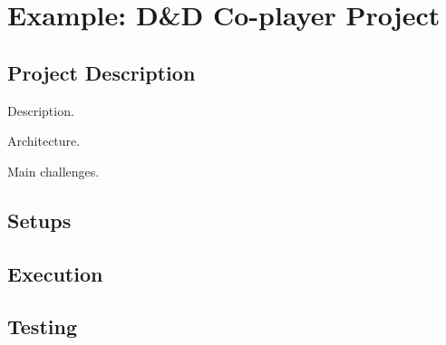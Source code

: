 \section{Example: D\&D Co-player Project}

\subsection{Project Description}

Description.

Architecture.

Main challenges.

\subsection{Setups}

\subsection{Execution}

\subsection{Testing}

